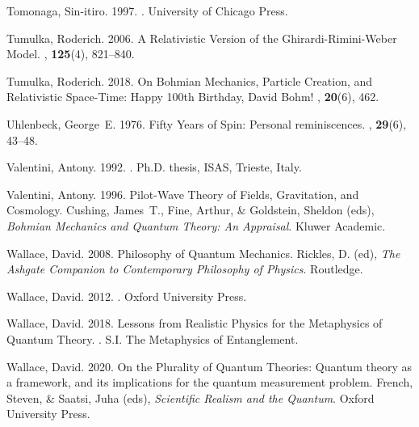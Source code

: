 \documentclass[12pt,secnumarabic,amsmath,amssymb,balancelastpage,nofootinbib]{article}
\begin{document}
\begin{thebibliography}{}
Tomonaga, Sin-itiro. 1997.
.
\newblock University of Chicago Press.

Tumulka, Roderich. 2006.
\newblock A Relativistic Version of the Ghirardi-Rimini-Weber Model.
, {\bf 125}(4), 821--840.

Tumulka, Roderich. 2018.
\newblock On Bohmian Mechanics, Particle Creation, and Relativistic Space-Time:
  Happy 100th Birthday, David Bohm!
, {\bf 20}(6), 462.

Uhlenbeck, George~E. 1976.
\newblock Fifty Years of Spin: Personal reminiscences.
, {\bf 29}(6), 43--48.

Valentini, Antony. 1992.
.
\newblock Ph.D. thesis, ISAS, Trieste, Italy.

Valentini, Antony. 1996.
\newblock Pilot-Wave Theory of Fields, Gravitation, and Cosmology.
 Cushing, James~T., Fine, Arthur, \&
  Goldstein, Sheldon (eds), {\em Bohmian Mechanics and Quantum Theory: An
  Appraisal}.
\newblock Kluwer Academic.

Wallace, David. 2008.
\newblock Philosophy of Quantum Mechanics.
 Rickles, D. (ed), {\em The Ashgate Companion
  to Contemporary Philosophy of Physics}.
\newblock Routledge.

Wallace, David. 2012.
.
\newblock Oxford University Press.

Wallace, David. 2018.
\newblock Lessons from Realistic Physics for the Metaphysics of Quantum Theory.
.
\newblock S.I. The Metaphysics of Entanglement.

Wallace, David. 2020.
\newblock On the Plurality of Quantum Theories: Quantum theory as a framework,
  and its implications for the quantum measurement problem.
 French, Steven, \& Saatsi, Juha (eds), {\em Scientific
  Realism and the Quantum}.
\newblock Oxford University Press.


\end{thebibliography}
\end{document}
